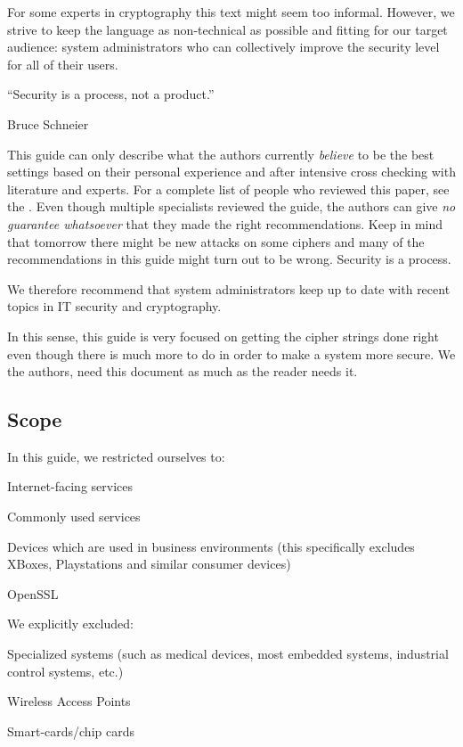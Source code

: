 For some experts in cryptography this text might seem too informal. However, we
strive to keep the language as non-technical as possible and fitting for our
target audience: system administrators who can collectively improve the
security level for all of their users. 



\epigraph{``Security is a process, not a product.''}{Bruce Schneier}

This guide can only describe what the authors currently
\emph{believe} to be the best settings based on their personal experience and
after intensive cross checking with literature and experts. For a complete list
of people who reviewed this paper, see the .
Even though multiple specialists reviewed the guide, the authors can give
\emph{no guarantee whatsoever} that they made the right recommendations. Keep in
mind that tomorrow there might be new attacks on some ciphers and many of the
recommendations in this guide might turn out to be wrong. Security is a
process.


We therefore recommend that system administrators keep up to date with recent
topics in IT security and cryptography. 


In this sense, this guide is very focused on getting the cipher strings done
right even though there is much more to do in order to make a system more
secure.  We the authors, need this document as much as the reader needs it.

\subsection*{Scope}
\label{section:Scope}

In this guide, we restricted ourselves to:
\begin{itemize*}
  \item Internet-facing services
  \item Commonly used services
  \item Devices which are used in business environments (this specifically excludes XBoxes, Playstations and similar consumer devices)
  \item OpenSSL 
\end{itemize*}

We explicitly excluded:
\begin{itemize*}
  \item Specialized systems (such as medical devices, most embedded systems, industrial control systems, etc.)
  \item Wireless Access Points
  \item Smart-cards/chip cards
\end{itemize*}



